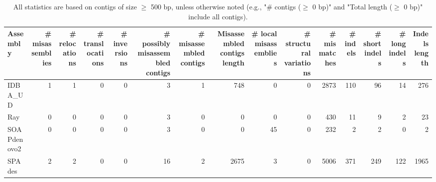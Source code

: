 \documentclass[12pt,a4paper]{article}
\begin{document}
\begin{table}[ht]
\begin{center}
\caption{All statistics are based on contigs of size $\geq$ 500 bp, unless otherwise noted (e.g., "\# contigs ($\geq$ 0 bp)" and "Total length ($\geq$ 0 bp)" include all contigs).}
\begin{tabular}{|l*{14}{|r}|}
\hline
Assembly & \# misassemblies &     \# relocations &     \# translocations &     \# inversions & \# possibly misassembled contigs & \# misassembled contigs & Misassembled contigs length & \# local misassemblies & \# structural variations & \# mismatches & \# indels &     \# short indels &     \# long indels & Indels length \\ \hline
IDBA\_UD & 1 & 1 & 0 & 0 & 3 & 1 & 748 & 0 & 0 & 2873 & 110 & 96 & 14 & 276 \\ \hline
Ray & 0 & 0 & 0 & 0 & 3 & 0 & 0 & 0 & 0 & 430 & 11 & 9 & 2 & 23 \\ \hline
SOAPdenovo2 & 0 & 0 & 0 & 0 & 3 & 0 & 0 & 45 & 0 & 232 & 2 & 2 & 0 & 2 \\ \hline
SPAdes & 2 & 2 & 0 & 0 & 16 & 2 & 2675 & 3 & 0 & 5006 & 371 & 249 & 122 & 1965 \\ \hline
\end{tabular}
\end{center}
\end{table}
\end{document}
